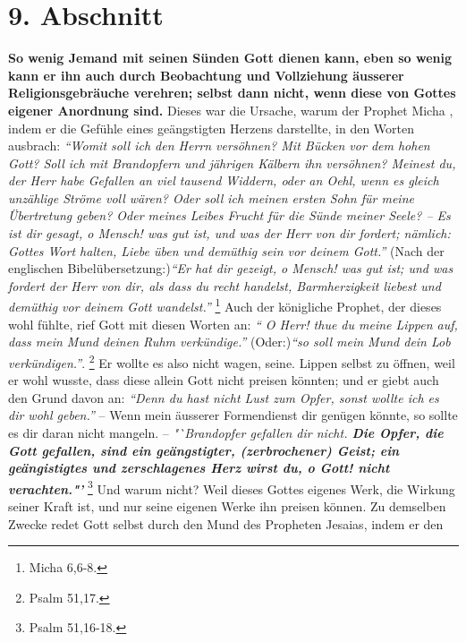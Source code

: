 \section{9. Abschnitt} \label{kap6_ab9}

\textbf{So wenig Jemand mit seinen Sünden Gott dienen kann, eben so wenig kann
er ihn
auch durch Beobachtung und Vollziehung äusserer Religionsgebräuche verehren;
selbst dann nicht, wenn diese von Gottes eigener Anordnung sind.}
 Dieses war die
Ursache, warum der Prophet Micha , indem er die Gefühle
eines geängstigten
Herzens darstellte, in den Worten ausbrach:
\textit{"`Womit soll ich den Herrn versöhnen? Mit Bücken vor dem hohen Gott?
Soll ich mit Brandopfern und jährigen Kälbern ihn versöhnen? Meinest du, der
Herr habe Gefallen an viel tausend Widdern, oder an Oehl, wenn es gleich
unzählige Ströme voll wären? Oder soll ich meinen ersten Sohn für meine
Übertretung geben? Oder meines Leibes Frucht für die Sünde meiner Seele? -- Es
ist dir gesagt, o Mensch! was gut ist, und was der Herr von dir fordert;
nämlich: Gottes Wort halten, Liebe üben und demüthig sein vor deinem Gott."'}
(Nach der englischen Bibelübersetzung:)\textit{"`Er hat dir gezeigt,
o Mensch! was gut ist; und was fordert der Herr von dir, als dass du recht
handelst, Barmherzigkeit liebest und demüthig vor deinem Gott
wandelst."'}
\footnote{Micha 6,6-8.}
Auch der königliche Prophet, der dieses
wohl fühlte, rief Gott mit diesen Worten an:
\textit{"` O Herr! thue du meine Lippen auf,
dass mein Mund deinen Ruhm verkündige."'} (Oder:)\textit{"`so soll mein Mund
dein Lob
verkündigen."'}.
\footnote{Psalm 51,17.}
Er wollte es also nicht wagen,
seine. Lippen selbst zu öffnen, weil er wohl wusste, dass diese allein Gott
nicht preisen könnten; und er giebt auch den Grund davon an:
\textit{"`Denn du hast
nicht Lust zum Opfer, sonst wollte ich es dir wohl geben."'} -- Wenn mein
äusserer Formendienst dir genügen könnte, so sollte es dir daran nicht mangeln.
--
\textit{"`Brandopfer  gefallen dir nicht. \textbf{Die Opfer,
die Gott gefallen, sind ein geängstigter, (zerbrochener) Geist; ein
geängistigtes und zerschlagenes Herz wirst du, o Gott! nicht verachten."'}}
\footnote{Psalm 51,16-18.}
Und warum
nicht? Weil dieses Gottes eigenes Werk, die Wirkung seiner Kraft ist, und nur
seine eigenen Werke ihn preisen können. Zu demselben Zwecke redet Gott selbst
durch den Mund des Propheten Jesaias, indem er den
